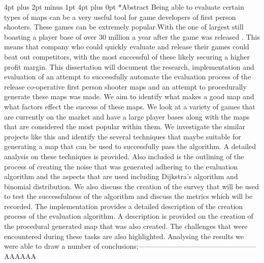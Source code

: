 \documentclass[12pt,a4paper,oneside]{book}
\makeatletter
\renewcommand\section{\@startsection {section}{1}{0mm} %
                               {4pt plus 2pt minus 1pt} %
                               {4pt plus 0pt} %
                               {\bfseries}}
\makeatother
\begin{document}
\frontmatter



\pagebreak

\pagebreak

\section*{Abstract}
Being able to evaluate certain types of maps can be a very useful tool for game developers of first person shooters. These games can be extremely popular.With the one of largest still boasting a player base of over 30 million a year after the game was released \cite{OverwatchPopularity}. This means that company who could quickly evaluate and release their games could beat out competitors, with the most successful of these likely securing a higher profit margin.
\vspace{5mm} 
\newline
 This dissertation will document the research, implementation and evaluation of an attempt to successfully automate the evaluation process of the release co-operative first person shooter maps and an attempt to procedurally generate these maps was made. We aim to identify what makes a good map and what factors effect the success of these maps.
 \vspace{5mm} 
 \newline
 We look at a variety of games that are currently on the market and have a large player bases along with the maps that are considered the most popular within them. We investigate the similar projects like this and identify the several techniques that maybe suitable for generating a map that can be used to successfully pass the algorithm.
  \vspace{5mm} 
 \newline
 A detailed analysis on these techniques is provided. Also included is the outlining of the process of creating the noise that was generated adhering to the evaluation algorithm and the aspects that are used including Dijkstra's algorithm and binomial distribution. We also discuss the creation of the survey that will be used to test the successfulness of the algorithm and discuss the metrics which will be recorded. 
  \vspace{5mm} 
 \newline 
 The implementation provides a detailed description of the creation process of the evaluation algorithm. A description is provided on the creation of the procedural generated map that was also created. The challenges that were encountered during these tasks are also highlighted.
  \vspace{5mm} 
 \newline 
 Analysing the results we were able to draw a number of conclusions;--------------------------------------------------AAAAAA
\tableofcontents 
\end{document}
